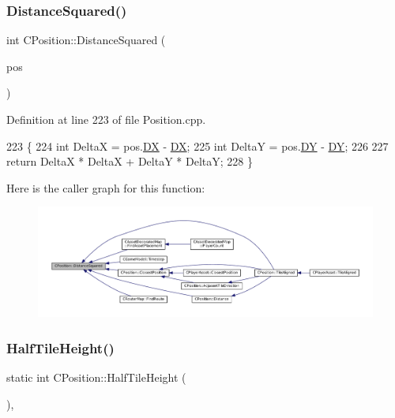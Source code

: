 \subsubsection{\texorpdfstring{Distance\+Squared()}{DistanceSquared()}}
{\footnotesize\ttfamily int C\+Position\+::\+Distance\+Squared (\begin{DoxyParamCaption}\item[{const \hyperlink{classCPosition}{C\+Position} \&}]{pos }\end{DoxyParamCaption})}



Definition at line 223 of file Position.\+cpp.


\begin{DoxyCode}
223                                                   \{
224     \textcolor{keywordtype}{int} DeltaX = pos.\hyperlink{classCPosition_a28445f9b872169715919074d82044eda}{DX} - \hyperlink{classCPosition_a28445f9b872169715919074d82044eda}{DX};
225     \textcolor{keywordtype}{int} DeltaY = pos.\hyperlink{classCPosition_a84139c9e8eb547e7cf3cb851739943a4}{DY} - \hyperlink{classCPosition_a84139c9e8eb547e7cf3cb851739943a4}{DY};
226     
227     \textcolor{keywordflow}{return} DeltaX * DeltaX + DeltaY * DeltaY;
228 \}
\end{DoxyCode}
Here is the caller graph for this function\+:\nopagebreak
\begin{figure}[H]
\begin{center}
\leavevmode
\includegraphics[width=350pt]{classCPosition_acd96d507f44c0fdf13036ebc1a09e59c_icgraph}
\end{center}
\end{figure}
\hypertarget{classCPosition_a5e371060b1aa0d3d3c5df1e353e0e5fd}{}\label{classCPosition_a5e371060b1aa0d3d3c5df1e353e0e5fd} 
\subsubsection{\texorpdfstring{Half\+Tile\+Height()}{HalfTileHeight()}}
{\footnotesize\ttfamily static int C\+Position\+::\+Half\+Tile\+Height (\begin{DoxyParamCaption}{ }\end{DoxyParamCaption})\hspace{0.3cm}{\ttfamily [inline]}, {\ttfamily [static]}}



